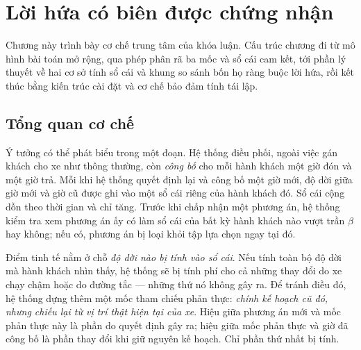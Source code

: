 \chapter{Lời hứa có biên được chứng nhận}

Chương này trình bày cơ chế trung tâm của khóa luận. Cấu trúc chương đi từ mô hình bài toán mở
rộng, qua phép phân rã ba mốc và sổ cái cam kết, tới phần lý thuyết về hai cơ sở tính sổ cái và
khung so sánh bốn họ ràng buộc lời hứa, rồi kết thúc bằng kiến trúc cài đặt và cơ chế bảo đảm
tính tái lập.

\section{Tổng quan cơ chế}

Ý tưởng có thể phát biểu trong một đoạn. Hệ thống điều phối, ngoài việc gán khách cho xe như
thông thường, còn \emph{công bố} cho mỗi hành khách một giờ đón và một giờ trả. Mỗi khi hệ
thống quyết định lại và công bố một giờ mới, độ dời giữa giờ mới và giờ cũ được ghi vào một sổ
cái riêng của hành khách đó. Sổ cái cộng dồn theo thời gian và chỉ tăng. Trước khi chấp nhận
một phương án, hệ thống kiểm tra xem phương án ấy có làm sổ cái của bất kỳ hành khách nào vượt
trần $\beta$ hay không; nếu có, phương án bị loại khỏi tập lựa chọn ngay tại đó.

Điểm tinh tế nằm ở chỗ \emph{độ dời nào bị tính vào sổ cái}. Nếu tính toàn bộ độ dời mà hành
khách nhìn thấy, hệ thống sẽ bị tính phí cho cả những thay đổi do xe chạy chậm hoặc do đường
tắc --- những thứ nó không gây ra. Để tránh điều đó, hệ thống dựng thêm một mốc tham chiếu phản
thực: \emph{chính kế hoạch cũ đó, nhưng chiếu lại từ vị trí thật hiện tại của xe}. Hiệu giữa
phương án mới và mốc phản thực này là phần do quyết định gây ra; hiệu giữa mốc phản thực và giờ
đã công bố là phần thay đổi khi giữ nguyên kế hoạch. Chỉ phần thứ nhất bị tính.

